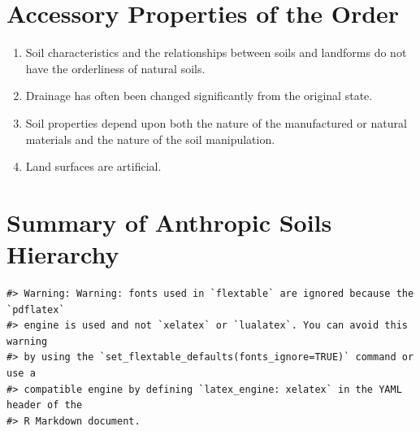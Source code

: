 \documentclass[
  letterpaper,
  DIV=11,
  numbers=noendperiod]{scrreprt}
\providecommand{\tightlist}{%
  \setlength{\itemsep}{0pt}\setlength{\parskip}{0pt}}\usepackage{longtable,booktabs,array}
\begin{document}
\hypertarget{sec-acc-A}{%
\section{Accessory Properties of the Order}\label{sec-acc-A}}

\begin{enumerate}
\def\labelenumi{\arabic{enumi}.}
\tightlist
\item
  Soil characteristics and the relationships between soils and landforms
  do not have the orderliness of natural soils.
\item
  Drainage has often been changed significantly from the original state.
\item
  Soil properties depend upon both the nature of the manufactured or
  natural materials and the nature of the soil manipulation.
\item
  Land surfaces are artificial.
\end{enumerate}

\hypertarget{sec-sum-A}{%
\section{Summary of Anthropic Soils Hierarchy}\label{sec-sum-A}}

\begin{verbatim}
#> Warning: Warning: fonts used in `flextable` are ignored because the `pdflatex`
#> engine is used and not `xelatex` or `lualatex`. You can avoid this warning
#> by using the `set_flextable_defaults(fonts_ignore=TRUE)` command or use a
#> compatible engine by defining `latex_engine: xelatex` in the YAML header of the
#> R Markdown document.
\end{verbatim}

\providecommand{\docline}[3]{\noalign{\global\setlength{\arrayrulewidth}{#1}}\arrayrulecolor[HTML]{#2}\cline{#3}}

\setlength{\tabcolsep}{2pt}

\renewcommand*{\arraystretch}{1.5}
\end{document}
